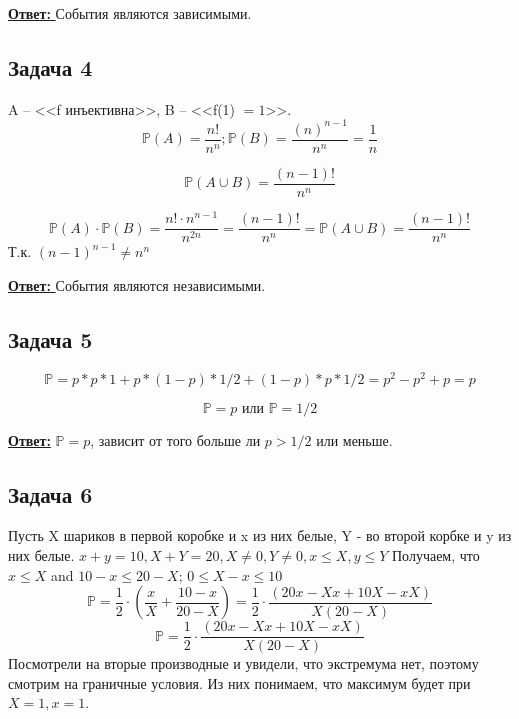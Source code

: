 \documentclass[a4paper,14pt]{article} %
\begin{document}
\underline{\textbf{Ответ: }} События являются зависимыми.

\subsection{Задача 4}
A -- <<f инъективна>>, B -- <<f(1) $= 1$>>.
\begin{equation*}
	\mathds{P}(A) = \frac{n!}{n^n}; \mathds{P}(B) = \frac{(n)^{n-1}}{n^n} = \frac{1}{n}	
\end{equation*}

\begin{equation*}
	\mathds{P}(A \cup B) = \frac{(n-1)!}{n^n}
\end{equation*}

\begin{equation*}
	\mathds{P}(A) \cdot \mathds{P}(B) = \frac{n! \cdot n^{n-1}}{n^{2n}} = \frac{(n-1)!}{n^n} = \mathds{P}(A \cup B) = \frac{(n-1)!}{n^n}
\end{equation*}
Т.к. $(n-1)^{n-1} \not = n^n$

\underline{\textbf{Ответ: }} События являются независимыми.

\subsection{Задача 5}
\begin{equation*}
	\mathds{P} = p * p * 1 + p * (1-p) * 1/2 + (1-p) * p * 1/2 = p^2 - p^2 + p = p
\end{equation*}

\begin{equation*}
	\mathds{P} = p \text{  или  } \mathds{P} = 1/2
\end{equation*}

\underline{\textbf{Ответ:}} $\mathds{P} = p$, зависит от того больше ли $p > 1/2$ или меньше.

\subsection{Задача 6}
Пусть X шариков в первой коробке и x из них белые, Y - во второй корбке и y из них белые. $x + y = 10, X + Y = 20, X \not = 0, Y \not = 0, x \leq X, y \leq Y$
\newline
Получаем, что $x \leq X$ and $10 - x \leq 20 - X$; $0 \leq X - x \leq 10$
\begin{equation*}
	\mathds{P} = \frac{1}{2} \cdot (\frac{x}{X} + \frac{10-x}{20-X}) = \frac{1}{2} \cdot \frac{(20x - Xx + 10X - xX)}{X (20 - X)}
\end{equation*}
\begin{equation*}
	\mathds{P} = \frac{1}{2} \cdot \frac{(20x - Xx + 10X - xX)}{X (20 - X)} 
\end{equation*}
Посмотрели на вторые производные и увидели, что экстремума нет, поэтому смотрим на граничные условия.
Из них понимаем, что максимум будет при $X = 1, x = 1$.
\end{document}
